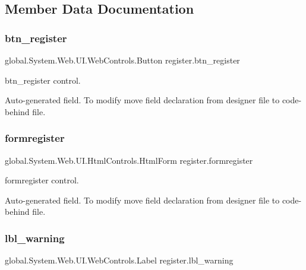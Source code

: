 \subsection{Member Data Documentation}
\mbox{\label{classregister_a95d65889e8a217375ee982f4c316fad4}} 
\subsubsection{\texorpdfstring{btn\_register}{btn\_register}}
{\footnotesize\ttfamily global.\+System.\+Web.\+U\+I.\+Web\+Controls.\+Button register.\+btn\+\_\+register\hspace{0.3cm}{\ttfamily [protected]}}



btn\+\_\+register control. 

Auto-\/generated field. To modify move field declaration from designer file to code-\/behind file. \mbox{\label{classregister_a8a2c5ccf4be2b84fc284840f7e005794}} 
\subsubsection{\texorpdfstring{formregister}{formregister}}
{\footnotesize\ttfamily global.\+System.\+Web.\+U\+I.\+Html\+Controls.\+Html\+Form register.\+formregister\hspace{0.3cm}{\ttfamily [protected]}}



formregister control. 

Auto-\/generated field. To modify move field declaration from designer file to code-\/behind file. \mbox{\label{classregister_a31768368486c20adfe2f982e694493e4}} 
\subsubsection{\texorpdfstring{lbl\_warning}{lbl\_warning}}
{\footnotesize\ttfamily global.\+System.\+Web.\+U\+I.\+Web\+Controls.\+Label register.\+lbl\+\_\+warning\hspace{0.3cm}{\ttfamily [protected]}}



